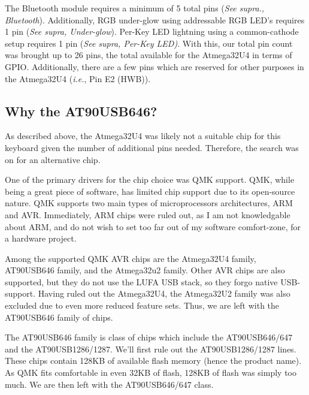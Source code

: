 \documentclass[11pt]{article}
\begin{document}
The Bluetooth module requires a minimum of 5 total pins (\emph{See supra., Bluetooth}). Additionally, RGB under-glow using addressable RGB LED's requires 1 pin (\emph{See supra, Under-glow}). Per-Key LED lightning using a common-cathode setup requires 1 pin (\emph{See supra, Per-Key LED)}. With this, our total pin count was brought up to 26 pins, the total available for the Atmega32U4 in terms of GPIO. Additionally, there are a few pins which are reserved for other purposes in the Atmega32U4 (\emph{i.e.}, Pin E2 (HWB)).

\subsection{Why the AT90USB646?}

As described above, the Atmega32U4 was likely not a suitable chip for this keyboard given the number of additional pins needed. Therefore, the search was on for an alternative chip. 

One of the primary drivers for the chip choice was QMK support. QMK, while being a great piece of software, has limited chip support\footnotemark {}  due to its open-source nature. QMK supports two main types of microprocessors architectures, ARM and AVR. Immediately, ARM chips were ruled out, as I am not knowledgable about ARM, and do not wish to set too far out of my software comfort-zone, for a hardware project. 

Among the supported QMK AVR chips are the Atmega32U4 family, AT90USB646 family, and the Atmega32u2 family. Other AVR chips are also supported, but they do not use the LUFA USB stack, so they forgo native USB-support. Having ruled out the Atmega32U4, the Atmega32U2 family was also excluded due to even more reduced feature sets. Thus, we are left with the AT90USB646 family of chips.

The AT90USB646 family is class of chips which include the AT90USB646/647 and the AT90USB1286/1287. We'll first rule out the AT90USB1286/1287 lines. These chips contain 128KB of available flash memory (hence the product name). As QMK fits comfortable in even 32KB of flash\footnotemark {}, 128KB of flash was simply too much. We are then left with the AT90USB646/647 class.
\end{document}

